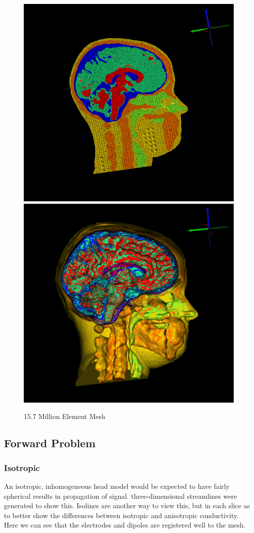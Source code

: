 \begin{figure}[H]
\begin{center}
\includegraphics[width=.49\textwidth]{Figures/smallmesh_2}
\includegraphics[width=.49\textwidth]{Figures/smallmesh_surface}
\caption{15.7 Million Element Mesh}
\label{fig:smallmesh}
\end{center}
\end{figure}

\subsection{Forward Problem}

\subsubsection{Isotropic}

An isotropic, inhomogeneous head model would be expected to have fairly spherical results in propagation of signal. three-dimensional streamlines were generated to show this. Isolines are another way to view this, but in each slice as to better show the differences between isotropic and anisotropic conductivity. Here we can see that the electrodes and dipoles are registered well to the mesh. 

